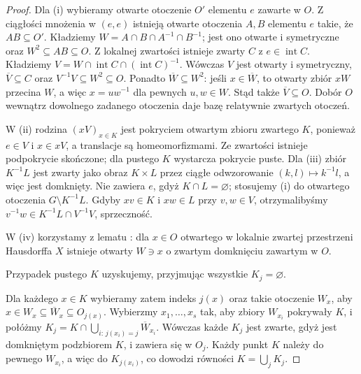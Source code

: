 \begin{proof}
Dla (i) wybieramy otwarte otoczenie $O'$ elementu $e$
zawarte w $O$. Z ciągłości mnożenia w $(e,e)$
istnieją otwarte otoczenia $A,B$ elementu $e$
takie, że $AB\subseteq O'$. Kładziemy
$W=A\cap B\cap A^{-1}\cap B^{-1}$; jest ono
otwarte i symetryczne oraz $W^2\subseteq AB\subseteq O$.
Z lokalnej zwartości istnieje zwarty $C$ z
$e\in\operatorname{int}C$. Kładziemy
$V=W\cap\operatorname{int}C\cap(\operatorname{int}C)^{-1}$.
Wówczas $V$ jest otwarty i symetryczny,
$\overline V\subseteq C$ oraz
$V^{-1}V\subseteq W^2\subseteq O$.
Ponadto $\overline W\subseteq W^2$: jeśli $x\in\overline W$,
to otwarty zbiór $xW$ przecina $W$, a więc
$x=uw^{-1}$ dla pewnych $u,w\in W$.
Stąd także $\overline V\subseteq O$.
Dobór $O$ wewnątrz dowolnego zadanego otoczenia
daje bazę relatywnie zwartych otoczeń.

W (ii) rodzina $(xV)_{x\in K}$ jest pokryciem otwartym
zbioru zwartego $K$, ponieważ $e\in V$ i $x\in xV$,
a translacje są homeomorfizmami. Ze zwartości istnieje
podpokrycie skończone; dla pustego $K$ wystarcza pokrycie puste.
Dla (iii) zbiór $K^{-1}L$ jest zwarty jako obraz
$K\times L$ przez ciągłe odwzorowanie
$(k,l)\mapsto k^{-1}l$, a więc jest domknięty.
Nie zawiera $e$, gdyż $K\cap L=\varnothing$;
stosujemy (i) do otwartego otoczenia
$G\setminus K^{-1}L$. Gdyby $xv\in K$ i $xw\in L$
przy $v,w\in V$, otrzymalibyśmy
$v^{-1}w\in K^{-1}L\cap V^{-1}V$, sprzeczność.

W (iv) korzystamy z lematu :
dla $x\in O$ otwartego w lokalnie zwartej przestrzeni
Hausdorffa $X$ istnieje otwarty $W\ni x$ o zwartym
domknięciu zawartym w $O$.

Przypadek pustego $K$ uzyskujemy, przyjmując wszystkie $K_j=\varnothing$.

Dla każdego $x\in K$ wybieramy zatem indeks $j(x)$
oraz takie otoczenie $W_x$, aby
$x\in W_x\subseteq\overline W_x\subseteq O_{j(x)}$.
Wybierzmy $x_1,\dots,x_s$ tak, aby zbiory $W_{x_i}$
pokrywały $K$, i połóżmy
$K_j=K\cap\bigcup_{i:\,j(x_i)=j}\overline W_{x_i}$.
Wówczas każde $K_j$ jest zwarte, gdyż jest domkniętym
podzbiorem $K$, i zawiera się w $O_j$.
Każdy punkt $K$ należy do pewnego $W_{x_i}$, a więc
do $K_{j(x_i)}$, co dowodzi równości
$K=\bigcup_j K_j$.
\end{proof}

